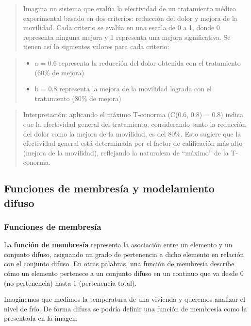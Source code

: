\documentclass[
  a4paper,
  DIV=11,
  numbers=noendperiod]{scrreprt}
\providecommand{\tightlist}{%
  \setlength{\itemsep}{0pt}\setlength{\parskip}{0pt}}\usepackage{longtable,booktabs,array}
\begin{document}
\begin{quote}
Imagina un sistema que evalúa la efectividad de un tratamiento médico
experimental basado en dos criterios: reducción del dolor y mejora de la
movilidad. Cada criterio se evalúa en una escala de 0 a 1, donde 0
representa ninguna mejora y 1 representa una mejora significativa. Se
tienen así lo siguientes valores para cada criterio:
\end{quote}

\begin{quote}
\begin{itemize}
\tightlist
\item
  a = 0.6 representa la reducción del dolor obtenida con el tratamiento
  (60\% de mejora)
\item
  b = 0.8 representa la mejora de la movilidad lograda con el
  tratamiento (80\% de mejora)
\end{itemize}
\end{quote}

\begin{quote}
Interpretación: aplicando el máximo T-conorma (C(0.6, 0.8) = 0.8) indica
que la efectividad general del tratamiento, considerando tanto la
reducción del dolor como la mejora de la movilidad, es del 80\%. Esto
sugiere que la efectividad general está determinada por el factor de
calificación más alto (mejora de la movilidad), reflejando la naturaleza
de ``máximo'' de la T-conorma.
\end{quote}

\subsection{Funciones de membresía y modelamiento
difuso}\label{funciones-de-membresuxeda-y-modelamiento-difuso}

\subsubsection{Funciones de membresía}\label{funciones-de-membresuxeda}

La \textbf{función de membresía} representa la asociación entre un
elemento y un conjunto difuso, asignando un grado de pertenencia a dicho
elemento en relación con el conjunto difuso. En otras palabras, una
función de membresía describe cómo un elemento pertenece a un conjunto
difuso en un continuo que va desde 0 (no pertenencia) hasta 1
(pertenencia total).

Imaginemos que medimos la temperatura de una vivienda y queremos
analizar el nivel de frío. De forma difusa se podría definir una función
de membresía como la presentada en la imagen:
\end{document}
